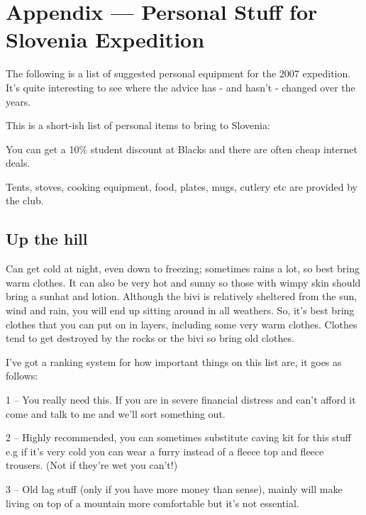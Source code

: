 \section{Appendix --- Personal Stuff for Slovenia Expedition}

The following is a list of suggested personal equipment for the 2007 expedition. It's quite interesting to see where the advice has - and hasn't - changed over the years.




This is a short-ish list of personal items to bring to Slovenia:

You can get a 10\% student discount at Blacks and there are often cheap internet deals.

Tents, stoves, cooking equipment, food, plates, mugs, cutlery etc are provided by the club.


\subsection{Up the hill}
Can get cold at night, even down to freezing; sometimes rains a lot, so best bring warm clothes. It can also be very hot and sunny so those with wimpy skin should bring a sunhat and lotion. Although the bivi is relatively sheltered from the sun, wind and rain, you will end up sitting around in all weathers. So, it’s best bring clothes that you can put on in layers, including some very warm clothes. Clothes tend to get destroyed by the rocks or the bivi so bring old clothes.


I’ve got a ranking system for how important things on this list are, it goes as follows:

1 – You really need this. If you are in severe financial distress and can’t afford it come and talk to me and we’ll sort something out.

2 – Highly recommended, you can sometimes substitute caving kit for this stuff e.g if it’s very cold you can wear a furry instead of a fleece top and fleece trousers. (Not if they're wet you can't!)

3 – Old lag stuff (only if you have more money than sense), mainly will make living on top of a mountain more comfortable but it’s not essential.

